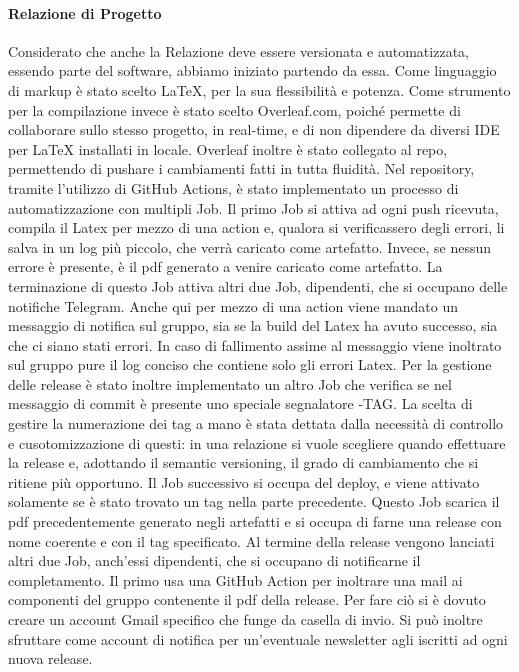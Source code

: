     \paragraph{Relazione di Progetto}
        Considerato che anche la Relazione deve essere versionata e automatizzata, essendo parte del software, abbiamo iniziato partendo da essa. 
        Come linguaggio di markup è stato scelto {\LaTeX}, per la sua flessibilità e potenza. 
        Come strumento per la compilazione invece è stato scelto Overleaf.com, poiché permette di collaborare sullo stesso progetto, in real-time, e di non dipendere da diversi IDE per {\LaTeX} installati in locale. 
        Overleaf inoltre è stato collegato al repo, permettendo di pushare i cambiamenti fatti in tutta fluidità. 
        Nel repository, tramite l'utilizzo di GitHub Actions, è stato implementato un processo di automatizzazione con multipli Job. 
        Il primo Job si attiva ad ogni push ricevuta, compila il Latex per mezzo di una action e, qualora si verificassero degli errori, li salva in un log più piccolo, che verrà caricato come artefatto. Invece, se nessun errore è presente, è il pdf generato a venire caricato come artefatto.
        La terminazione di questo Job attiva altri due Job, dipendenti, che si occupano delle notifiche Telegram. Anche qui per mezzo di una action viene mandato un messaggio di notifica sul gruppo, sia se la build del Latex ha avuto successo, sia che ci siano stati errori. In caso di fallimento assime al messaggio viene inoltrato sul gruppo pure il log conciso che contiene solo gli errori Latex. 
        Per la gestione delle release è stato inoltre implementato un altro Job che verifica se nel messaggio di commit è presente uno speciale segnalatore -TAG{}. 
        La scelta di gestire la numerazione dei tag a mano è stata dettata dalla necessità di controllo e cusotomizzazione di questi: in una relazione si vuole scegliere quando effettuare la release e, adottando il semantic versioning, il grado di cambiamento che si ritiene più opportuno.
        Il Job successivo si occupa del deploy, e viene attivato solamente se è stato trovato un tag nella parte precedente. Questo Job scarica il pdf precedentemente generato negli artefatti e si occupa di farne una release con nome coerente e con il tag specificato. 
        Al termine della release vengono lanciati altri due Job, anch'essi dipendenti, che si occupano di notificarne il completamento. 
        Il primo usa una GitHub Action per inoltrare una mail ai componenti del gruppo contenente il pdf della release. Per fare ciò si è dovuto creare un account Gmail specifico che funge da casella di invio. Si può inoltre sfruttare come account di notifica per un'eventuale newsletter agli iscritti ad ogni nuova release. 
